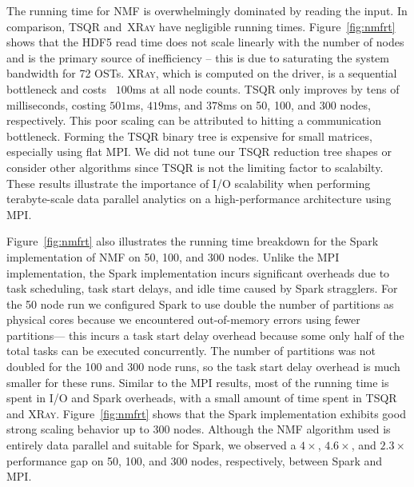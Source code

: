 The running time for NMF is overwhelmingly dominated by reading the input. In comparison, TSQR and~\textsc{XRay} have negligible running times. Figure~\ref{fig:nmfrt} shows that the HDF5 read time does not scale linearly with the number of nodes and is the primary source of inefficiency -- this is due to saturating the system bandwidth for 72 OSTs. \textsc{XRay}, which is computed on the driver, is a sequential bottleneck and costs ~$100$ms at all node counts. TSQR only improves by tens of milliseconds, costing $501$ms, $419$ms, and $378$ms on 50, 100, and 300 nodes, respectively. This poor scaling can be attributed to hitting a communication bottleneck. Forming the TSQR binary tree is expensive for small matrices, especially using flat MPI. We did not tune our TSQR reduction tree shapes or consider other algorithms since TSQR is not the limiting factor to scalabilty. These results illustrate the importance of I/O scalability when performing terabyte-scale data parallel analytics on a high-performance architecture using MPI.

Figure~\ref{fig:nmfrt} also illustrates the running time breakdown for the Spark implementation of NMF on 50, 100, and 300 nodes. Unlike the MPI implementation, the Spark implementation incurs significant overheads due to task scheduling, task start delays, and idle time caused by Spark stragglers. For the 50 node run we configured Spark to use double the number of partitions as physical cores because we encountered out-of-memory errors using fewer partitions--- this incurs a task start delay overhead because some only half of the total tasks can be executed concurrently. The number of partitions was not doubled for the 100 and 300 node runs, so the task start delay overhead is much smaller for these runs. Similar to the MPI results, most of the running time is spent in I/O and Spark overheads, with a small amount of time spent in TSQR and \textsc{XRay}. Figure~\ref{fig:nmfrt} shows that the Spark implementation exhibits good strong scaling behavior up to 300 nodes.  Although the NMF algorithm used is entirely data parallel and suitable for Spark, we observed a $4\times$, $4.6\times$, and $2.3\times$ performance gap on 50, 100, and 300 nodes, respectively, between Spark and MPI.

